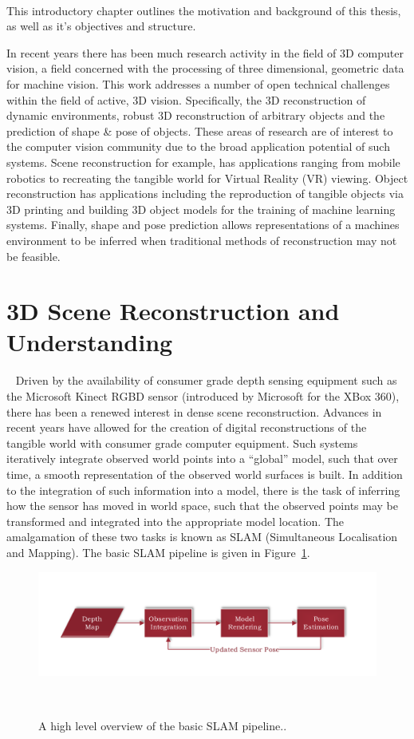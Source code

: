 ~\label{chap:intro}
\begin{chapterabstract}
This introductory chapter outlines the motivation and background of this thesis, as well as it's objectives 
and structure.
\end{chapterabstract}

In recent years there has been much research activity in the field of 3D computer vision, a field concerned 
with the processing of three dimensional, geometric data for machine vision. This work addresses a number of 
open technical challenges within the field of active, 3D vision. Specifically, the 3D reconstruction of 
dynamic environments, robust 3D reconstruction of arbitrary objects and the prediction of shape \& pose of 
objects. These areas of research are of interest to the computer vision community due to the broad application 
potential of such systems. Scene reconstruction for example, has applications ranging from mobile robotics to 
recreating the tangible world for Virtual Reality (VR) viewing. Object reconstruction has applications including 
the reproduction of tangible objects via 3D printing and building 3D object models for the training of machine 
learning systems. Finally, shape and pose prediction allows representations of a machines environment to be 
inferred when traditional methods of reconstruction may not be feasible.

\section{3D Scene Reconstruction and Understanding}
~\label{sec:intro_scene_recon}
Driven by the availability of consumer grade depth sensing equipment such as the Microsoft Kinect RGBD sensor 
(introduced by Microsoft for the XBox 360), there has been a renewed interest in dense scene reconstruction. 
Advances in recent years have allowed for the creation of digital reconstructions of the tangible world with 
consumer grade computer equipment. Such systems iteratively integrate observed world points into a ``global'' 
model, such that over time, a smooth representation of the observed world surfaces is built. In addition to the 
integration of such information into a model, there is the task of inferring how the sensor has moved in world 
space, such that the observed points may be transformed and integrated into the appropriate model location. The 
amalgamation of these two tasks is known as SLAM (Simultaneous Localisation and Mapping). The basic SLAM pipeline 
is given in Figure~\ref{figure:basic_slam}.
\begin{figure}[!htbp]
  \centering
  \includegraphics[width=\linewidth]{figures/intro/basic_slam.pdf}
  \caption[Basic SLAM Pipeline]{A high level overview of the basic SLAM pipeline..}
~\label{figure:basic_slam}
\end{figure}

